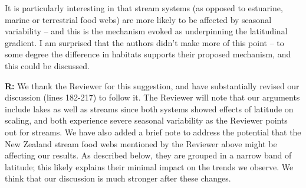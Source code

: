 \documentclass[12pt]{letter}
\newenvironment{refquote}{\bigskip \begin{it}}{\end{it}\smallskip}
\begin{document}
  \begin{refquote}

    It is particularly interesting in that stream systems (as opposed to
    estuarine, marine or terrestrial food webs) are more likely to be affected
    by seasonal variability – and this is the mechanism evoked as underpinning
    the latitudinal gradient. I am surprised that the authors didn’t make more
    of this point – to some degree the difference in habitats supports their
    proposed mechanism, and this could be discussed.

  \end{refquote}


  \textbf{R:} We thank the Reviewer for this suggestion, 
  and have substantially revised our discussion (lines 
  182-217) to follow it. The Reviewer will note that our 
  arguments include lakes as well as streams since both 
  systems showed effects of latitude on scaling, and both 
  experience severe seasonal variability as the Reviewer
  points out for streams. We have also added a brief note 
  to address the potential that the New Zealand stream food 
  webs mentioned by the Reviewer above might be affecting 
  our results. As described below, they are grouped in a 
  narrow band of latitude; this likely explains their 
  minimal impact on the trends we observe. We think that 
  our discussion is much stronger after these changes.
\end{document}
